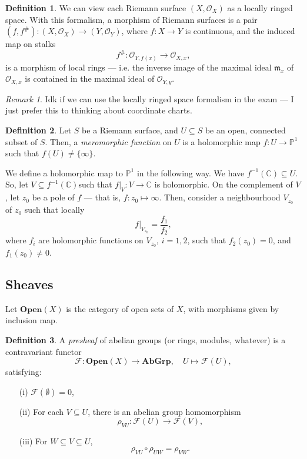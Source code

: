 \documentclass[a4paper]{report}
\theoremstyle{definition}
\newtheorem{definition}{Definition}
\theoremstyle{remark}
\newtheorem{remark}{Remark}
\theoremstyle{proposition}
\theoremstyle{conjecture}
\theoremstyle{lemma}
\theoremstyle{corollary}
\theoremstyle{exercise}
\theoremstyle{example}
\newcommand{\C}{\mathbb{C}}
\newcommand{\mcal}{\mathcal}
\begin{document}
\begin{definition}
    We can view each Riemann surface $(X,\mcal{O}_X)$ as a locally ringed 
    space. With this formalism, a morphism of Riemann surfaces is a pair
    $(f,f^\#) : (X,\mcal{O}_X) \to (Y,\mcal{O}_Y)$, where 
    $f : X \to Y$ is continuous, and the induced map on stalks
    $$f^\# : \mcal{O}_{Y,f(x)} \to \mcal{O}_{X,x},$$
    is a morphism of local rings --- i.e. the inverse image of the 
    maximal ideal $\mathfrak{m}_x$ 
    of $\mcal{O}_{X,x}$ is contained 
    in the maximal ideal of $\mcal{O}_{Y,y}$.
\end{definition}

\begin{remark}
    Idk if we can use the locally ringed space formalism in the exam --- I just 
    prefer this to thinking about coordinate charts.
\end{remark}

\begin{definition}
    Let $S$ be a Riemann surface, and $U\subseteq S$ be an open, connected
    subset of $S$. Then, a \emph{meromorphic function} on $U$ is a 
    holomorphic map $f : U \to \mathbb{P}^1$ such that 
    $f(U) \neq \lbrace\infty\rbrace$.
\end{definition}

We define a holomorphic map to $\mathbb{P}^1$ in the following way.
We have $f^{-1}(\C) \subseteq U$. So, let $V\subseteq f^{-1}(\C)$such that $f\vert_V : V \to \C$ is holomorphic. On the complement of $V$,
let $z_0$ be a pole of $f$ --- that is, $f : z_0 \mapsto \infty$.
Then, consider a neighbourhood $V_{z_0}$ of $z_0$ such that locally
$$f\vert_{V_{z_0}} = \frac{f_1}{f_2},$$
where $f_i$ are holomorphic functions on $V_{z_0}$, $i=1,2$, such that 
$f_2(z_0) = 0$, and $f_1(z_0)\neq 0$.

\subsection{Sheaves}

Let $\mathbf{Open}(X)$ is the category of open sets of $X$,
with morphisms given by inclusion map.
\begin{definition}
    A \emph{presheaf} of abelian groups (or rings, modules, whatever) is 
    a contravariant functor 
    $$\mcal{F} : \mathbf{Open}(X) \longrightarrow \mathbf{AbGrp},\quad U\longmapsto \mcal{F}(U),$$
    satisfying:
    \begin{itemize}
        \item[(i)] $\mcal{F}(\emptyset) = 0$,
        \item[(ii)] For each $V\subseteq U$, there is an abelian group
            homomorphism
            $$\rho_{VU} : \mcal{F}(U) \longrightarrow \mcal{F}(V),$$
        \item[(iii)] For $W\subseteq V \subseteq U$, 
            $$\rho_{VU} \circ \rho_{UW} = \rho_{VW}.$$
    \end{itemize}
\end{definition}
\end{document}
